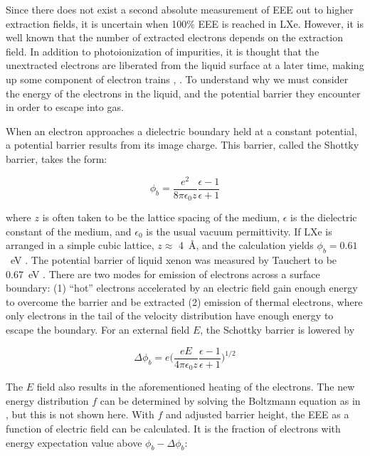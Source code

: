Since there does not exist a second absolute measurement of \ac{EEE} out to higher extraction fields, it is uncertain when 100\% \ac{EEE} is reached in \ac{LXe}. However, it is well known that the number of extracted electrons depends on the extraction field. In addition to photoionization of impurities, it is thought that the unextracted electrons are liberated from the liquid surface at a later time, making up some component of electron trains \cite{Aprile2014}, \cite{Edwards2018}. To understand why we must consider the energy of the electrons in the liquid, and the potential barrier they encounter in order to escape into gas.

When an electron approaches a dielectric boundary held at a constant potential, a potential barrier results from its image charge. This barrier, called the Shottky barrier, takes the form:

\begin{equation}
\phi_{b} = \frac{e^{2}}{8\pi \epsilon_{0} z} \frac{\epsilon - 1}{\epsilon + 1}
\end{equation}

where $z$ is often taken to be the lattice spacing of the medium, $\epsilon$ is the dielectric constant of the medium, and $\epsilon_{0}$ is the usual vacuum permittivity. If \ac{LXe} is arranged in a simple cubic lattice, $z \approx$ 4~\AA, and the calculation yields $\phi_{b} = 0.61$~eV \cite{Sorensen2017}. The potential barrier of liquid xenon was measured by Tauchert to be 0.67~eV \cite{Tauchert1975}. There are two modes for emission of electrons across a surface boundary: (1) ``hot'' electrons accelerated by an electric field gain enough energy to overcome the barrier and be extracted (2) emission of thermal electrons, where only electrons in the tail of the velocity distribution have enough energy to escape the boundary. For an external field $E$, the Schottky barrier is lowered by

\begin{equation}
\Delta \phi_{b} = e \Big ( \frac{eE}{4\pi \epsilon_{0} z} \frac{\epsilon - 1}{\epsilon + 1} \Big ) ^{1/2}
\end{equation}

The $E$ field also results in the aforementioned heating of the electrons. The new energy distribution $f$ can be determined by solving the Boltzmann equation as in \cite{Cohen1967}, but this is not shown here. With $f$ and adjusted barrier height, the \ac{EEE} as a function of electric field can be calculated. It is the fraction of electrons with energy expectation value above $\phi_{b} - \Delta\phi_{b}$:

